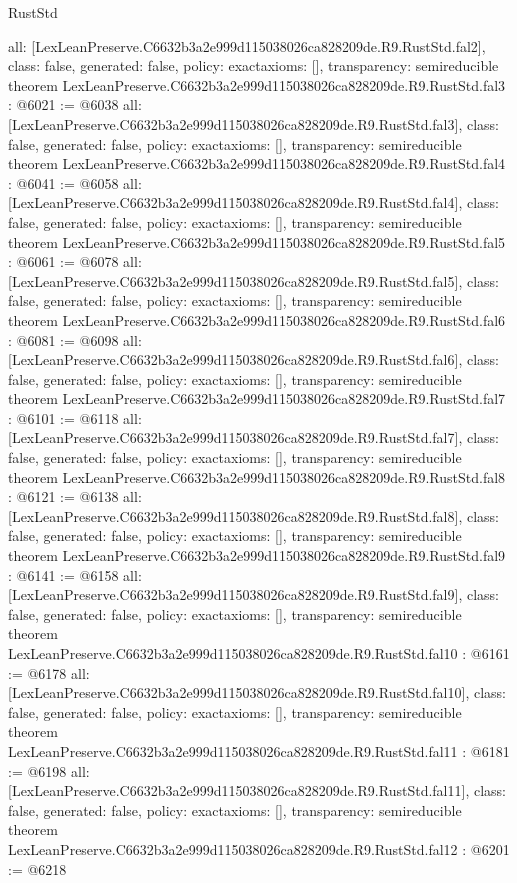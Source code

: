 \begin{lexlean}{RustStd}
\begin{coremodule}
{  all: [LexLeanPreserve.C6632b3a2e999d115038026ca828209de.R9.RustStd.fal2],
  class: false,
  generated: false,
  policy: exact{axioms: []},
  transparency: semireducible
}
theorem LexLeanPreserve.C6632b3a2e999d115038026ca828209de.R9.RustStd.fal3 : @6021 := @6038 {
  all: [LexLeanPreserve.C6632b3a2e999d115038026ca828209de.R9.RustStd.fal3],
  class: false,
  generated: false,
  policy: exact{axioms: []},
  transparency: semireducible
}
theorem LexLeanPreserve.C6632b3a2e999d115038026ca828209de.R9.RustStd.fal4 : @6041 := @6058 {
  all: [LexLeanPreserve.C6632b3a2e999d115038026ca828209de.R9.RustStd.fal4],
  class: false,
  generated: false,
  policy: exact{axioms: []},
  transparency: semireducible
}
theorem LexLeanPreserve.C6632b3a2e999d115038026ca828209de.R9.RustStd.fal5 : @6061 := @6078 {
  all: [LexLeanPreserve.C6632b3a2e999d115038026ca828209de.R9.RustStd.fal5],
  class: false,
  generated: false,
  policy: exact{axioms: []},
  transparency: semireducible
}
theorem LexLeanPreserve.C6632b3a2e999d115038026ca828209de.R9.RustStd.fal6 : @6081 := @6098 {
  all: [LexLeanPreserve.C6632b3a2e999d115038026ca828209de.R9.RustStd.fal6],
  class: false,
  generated: false,
  policy: exact{axioms: []},
  transparency: semireducible
}
theorem LexLeanPreserve.C6632b3a2e999d115038026ca828209de.R9.RustStd.fal7 : @6101 := @6118 {
  all: [LexLeanPreserve.C6632b3a2e999d115038026ca828209de.R9.RustStd.fal7],
  class: false,
  generated: false,
  policy: exact{axioms: []},
  transparency: semireducible
}
theorem LexLeanPreserve.C6632b3a2e999d115038026ca828209de.R9.RustStd.fal8 : @6121 := @6138 {
  all: [LexLeanPreserve.C6632b3a2e999d115038026ca828209de.R9.RustStd.fal8],
  class: false,
  generated: false,
  policy: exact{axioms: []},
  transparency: semireducible
}
theorem LexLeanPreserve.C6632b3a2e999d115038026ca828209de.R9.RustStd.fal9 : @6141 := @6158 {
  all: [LexLeanPreserve.C6632b3a2e999d115038026ca828209de.R9.RustStd.fal9],
  class: false,
  generated: false,
  policy: exact{axioms: []},
  transparency: semireducible
}
theorem LexLeanPreserve.C6632b3a2e999d115038026ca828209de.R9.RustStd.fal10 : @6161 := @6178 {
  all: [LexLeanPreserve.C6632b3a2e999d115038026ca828209de.R9.RustStd.fal10],
  class: false,
  generated: false,
  policy: exact{axioms: []},
  transparency: semireducible
}
theorem LexLeanPreserve.C6632b3a2e999d115038026ca828209de.R9.RustStd.fal11 : @6181 := @6198 {
  all: [LexLeanPreserve.C6632b3a2e999d115038026ca828209de.R9.RustStd.fal11],
  class: false,
  generated: false,
  policy: exact{axioms: []},
  transparency: semireducible
}
theorem LexLeanPreserve.C6632b3a2e999d115038026ca828209de.R9.RustStd.fal12 : @6201 := @6218 {
}
\end{coremodule}
\end{lexlean}

